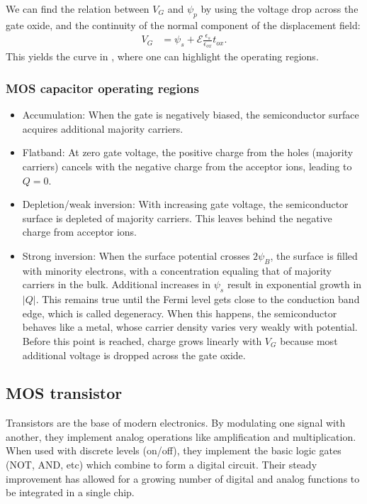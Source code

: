 We can find the relation between $V_G$ and $\psi_p$ by
using the voltage drop across the gate oxide,
and the continuity of the normal component of the displacement field:
\begin{align}
    V_G &= \psi_s + \mathscr{E}\frac{\epsilon_s}{\epsilon_{ox}}t_{ox}.
    \label{eq:potencial_campo_mos}
\end{align}
This yields the curve in ,
where one can highlight the operating regions.
%
\subsubsection{MOS capacitor operating regions}
\begin{itemize}
    \item Accumulation:
        When the gate is negatively biased,
        the semiconductor surface acquires additional majority carriers.
    \item Flatband:
        At zero gate voltage, the positive charge from the holes
        (majority carriers)
        cancels with the negative charge from the acceptor ions,
        leading to $Q=0$. 
    \item Depletion/weak inversion:
        With increasing gate voltage,
        the semiconductor surface is depleted of majority carriers.
        This leaves behind the negative charge from acceptor ions.
    \item Strong inversion:
        When the surface potential crosses $2\psi_B$,
        the surface is filled with minority electrons,
        with a concentration equaling that of majority carriers in the bulk.
        Additional increases in $\psi_s$ result in exponential growth in
        $|Q|$.
        This remains true until the Fermi level gets close to 
        the conduction band edge, which is called degeneracy.
        When this happens, the semiconductor behaves like a metal,
        whose carrier density varies very weakly with potential.
        Before this point is reached,
        charge grows linearly with $V_G$
        because most additional voltage is dropped across the gate oxide.
\end{itemize}
%
%
\subsection{MOS transistor}
Transistors are the base of modern electronics.
By modulating one signal with another,
they implement analog operations like amplification and multiplication.
When used with discrete levels (on/off),
they implement the basic logic gates (NOT, AND, etc)
which combine to form a digital circuit.
Their steady improvement has allowed for a growing number of 
digital and analog functions
to be integrated in a single chip.
%
